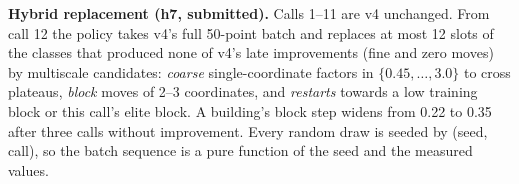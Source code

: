 \textbf{Hybrid replacement (h7, submitted).} Calls 1--11 are v4 unchanged. From call 12 the policy takes v4's full
50-point batch and replaces at most 12 slots of the classes that produced none of v4's late improvements (fine and
zero moves) by multiscale candidates: \emph{coarse} single-coordinate factors in $\{0.45,\dots,3.0\}$ to cross
plateaus, \emph{block} moves of 2--3 coordinates, and \emph{restarts} towards a low training block or this call's elite
block. A building's block step widens from 0.22 to 0.35 after three calls without improvement. Every random draw is
seeded by (seed, call), so the batch sequence is a pure function of the seed and the measured values.

